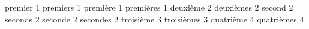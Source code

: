 %
%
%

%
%

premier             1\noexpand\ier%
premiers            1\noexpand\iers%
première            1\noexpand\iere%
premières           1\noexpand\ieres%
deuxième            2\noexpand\ieme%
deuxièmes           2\noexpand\iemes%
second              2\noexpand{}%
seconds             2\noexpand{}%
seconde             2\noexpand{}%
secondes            2\noexpand{}%
troisième           3\noexpand\ieme%
troisièmes          3\noexpand\iemes%
quatrième           4\noexpand\ieme%
quatrièmes          4\noexpand\iemes%

